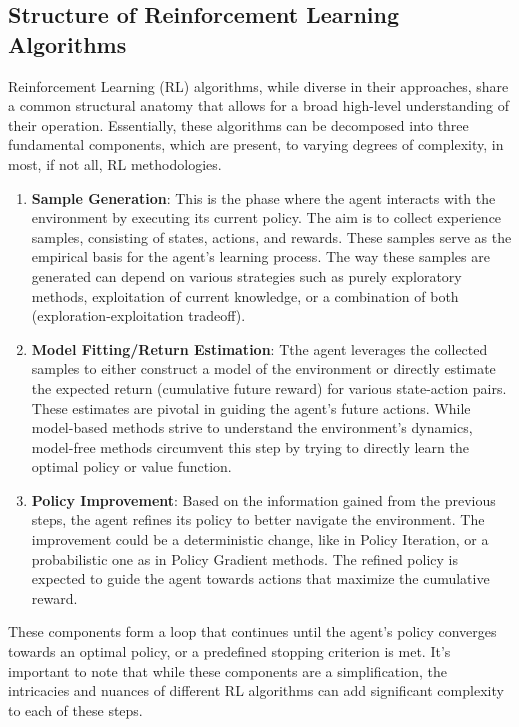\subsection{Structure of Reinforcement Learning Algorithms}
Reinforcement Learning (RL) algorithms, while diverse in their approaches, share a common structural anatomy that allows for a broad high-level understanding of their operation. Essentially, these algorithms can be decomposed into three fundamental components, which are present, to varying degrees of complexity, in most, if not all, RL methodologies.
\begin{enumerate}
    \item \textbf{Sample Generation}: This is the phase where the agent interacts with the environment by executing its current policy. The aim is to collect experience samples, consisting of states, actions, and rewards. These samples serve as the empirical basis for the agent's learning process. The way these samples are generated can depend on various strategies such as purely exploratory methods, exploitation of current knowledge, or a combination of both (exploration-exploitation tradeoff).

    \item \textbf{Model Fitting/Return Estimation}: Tthe agent leverages the collected samples to either construct a model of the environment or directly estimate the expected return (cumulative future reward) for various state-action pairs. These estimates are pivotal in guiding the agent's future actions. While model-based methods strive to understand the environment's dynamics, model-free methods circumvent this step by trying to directly learn the optimal policy or value function.

    \item \textbf{Policy Improvement}: Based on the information gained from the previous steps, the agent refines its policy to better navigate the environment. The improvement could be a deterministic change, like in Policy Iteration, or a probabilistic one as in Policy Gradient methods. The refined policy is expected to guide the agent towards actions that maximize the cumulative reward.
\end{enumerate}
These components form a loop that continues until the agent's policy converges towards an optimal policy, or a predefined stopping criterion is met. It's important to note that while these components are a simplification, the intricacies and nuances of different RL algorithms can add significant complexity to each of these steps.
